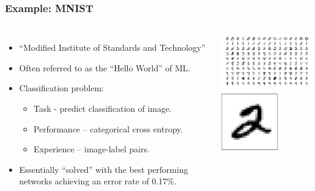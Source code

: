 \documentclass{beamer}
\begin{document}
\begin{frame}

    \frametitle{Example: MNIST}

    \begin{columns}

        
        \begin{itemize}
            \item “Modified Institute of Standards and Technology”
            \item Often referred to as the “Hello World” of ML.
            \item Classification problem:
                \begin{itemize}
                    \item Task - predict classification of image.
                    \item Performance – categorical cross entropy.
                    \item Experience – image-label pairs.
                \end{itemize}
            \item Essentially ``solved'' with the best performing networks achieving  an error rate of 0.17\%.
        \end{itemize}

            \begin{center}
                \includegraphics[height=2.5cm]{figs/mnist_examples.png}
                \includegraphics[height=2.5cm]{figs/mnist_example.png}    
            \end{center}
    \end{columns}
\end{frame}
\end{document}
